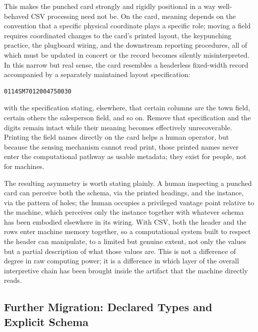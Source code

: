\documentclass[11pt]{article}
\begin{document}
This makes the punched card strongly and rigidly positional in a way well-behaved CSV processing need not be. On the card, meaning depends on the convention that a specific physical coordinate plays a specific role; moving a field requires coordinated changes to the card's printed layout, the keypunching practice, the plugboard wiring, and the downstream reporting procedures, all of which must be updated in concert or the record becomes silently misinterpreted. In this narrow but real sense, the card resembles a headerless fixed-width record accompanied by a separately maintained layout specification:
\begin{lstlisting}
0114SM7012004750030
\end{lstlisting}
with the specification stating, elsewhere, that certain columns are the town field, certain others the salesperson field, and so on. Remove that specification and the digits remain intact while their meaning becomes effectively unrecoverable. Printing the field names directly on the card helps a human operator, but because the sensing mechanism cannot read print, those printed names never enter the computational pathway as usable metadata; they exist for people, not for machines.

The resulting asymmetry is worth stating plainly. A human inspecting a punched card can perceive both the schema, via the printed headings, and the instance, via the pattern of holes; the human occupies a privileged vantage point relative to the machine, which perceives only the instance together with whatever schema has been embodied elsewhere in its wiring. With CSV, both the header and the rows enter machine memory together, so a computational system built to respect the header can manipulate, to a limited but genuine extent, not only the values but a partial description of what those values are. This is not a difference of degree in raw computing power; it is a difference in which layer of the overall interpretive chain has been brought inside the artifact that the machine directly reads.

\subsection{Further Migration: Declared Types and Explicit Schema}
\end{document}
